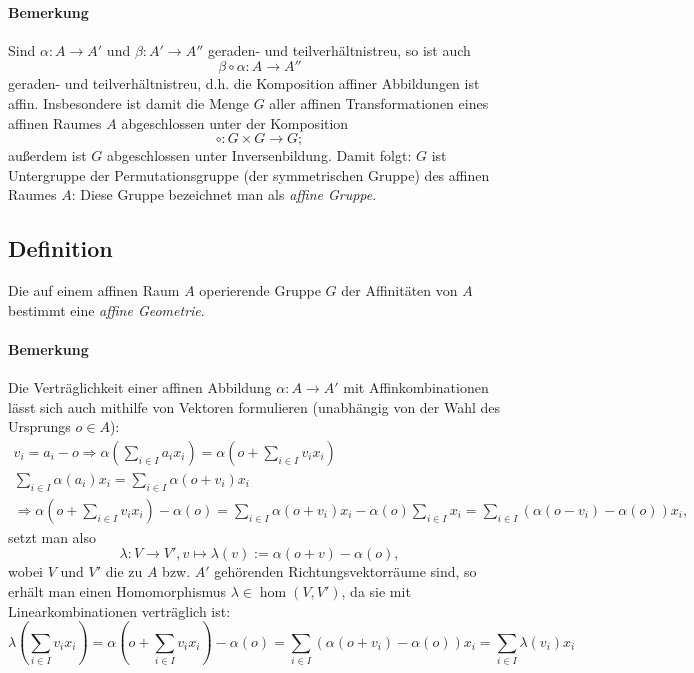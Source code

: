  	\paragraph{Bemerkung}
 		Sind $ \alpha:A \to A' $ und $ \beta:A'\to A'' $ geraden- und teilverhältnistreu, so ist auch
 		\[
 			\beta\circ\alpha:A\to A''
 		\]
 		geraden- und teilverhältnistreu, d.h. die Komposition affiner Abbildungen ist affin. Insbesondere ist damit die Menge $ G $ aller affinen Transformationen eines affinen Raumes $ A $ abgeschlossen unter der Komposition
 		\[
 			\circ: G\times G\to G;
 		\]
 		außerdem ist $ G $ abgeschlossen unter Inversenbildung. Damit folgt: $ G $ ist Untergruppe der Permutationsgruppe (der symmetrischen Gruppe) des affinen Raumes $ A $: Diese Gruppe bezeichnet man als \emph{affine Gruppe}.
 \subsection{Definition}
 	\begin{Definition}
 		Die auf einem affinen Raum $ A $ operierende Gruppe $ G $ der Affinitäten von $ A $ bestimmt eine \emph{affine Geometrie}.
 	\end{Definition}

 	\paragraph{Bemerkung}
 		Die Verträglichkeit einer affinen Abbildung $ \alpha:A\to A' $ mit Affinkombinationen lässt sich auch mithilfe von Vektoren formulieren (unabhängig von der Wahl des Ursprungs $ o \in A$):
 		\begin{gather*}
 			v_i = a_i-o \Rightarrow \alpha\left(\sum_{i\in I}a_ix_i\right)=\alpha\left(o+\sum_{i\in I}v_ix_i\right)\\
 			\sum_{i\in I}\alpha(a_i)x_i = \sum_{i\in I}\alpha(o+v_i)x_i\\
 			\Rightarrow \alpha\left(o+\sum_{i\in I}v_ix_i\right)-\alpha(o) = \sum_{i\in I}\alpha(o+v_i)x_i-\alpha(o)\sum_{i\in I}x_i = \sum_{i\in I}(\alpha(o-v_i)-\alpha(o))x_i,
 		\end{gather*}
 		setzt man also
 		\[
 			\lambda:V\to V',v\mapsto \lambda(v):= \alpha(o+v)-\alpha(o),
 		\]
 		wobei $ V $ und $ V' $ die zu $ A $ bzw. $ A' $ gehörenden Richtungsvektorräume sind, so erhält man einen Homomorphismus $ \lambda\in \hom(V,V') $, da sie mit Linearkombinationen verträglich ist:
 		\[
 			\lambda\left(\sum_{i\in I}v_ix_i\right)=\alpha\left(o+\sum_{i\in I}v_ix_i\right)-\alpha(o)= \sum_{i\in I}\left(\alpha(o+v_i)-\alpha(o)\right)x_i = \sum_{i\in I}\lambda(v_i)x_i
 		\]

